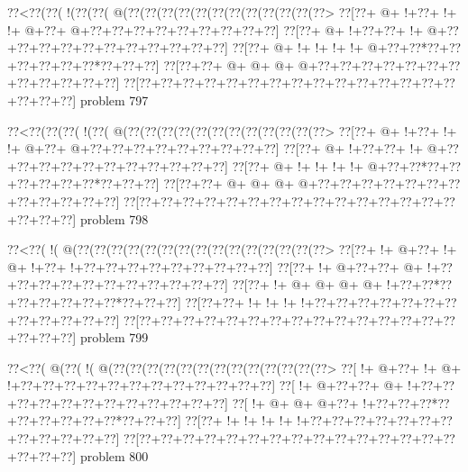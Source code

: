 \vbox{\vbox{\goo
\0??<\0??(\0??(\- !(\0??(\0??(\- @(\0??(\0??(\0??(\0??(\0??(\0??(\0??(\0??(\0??(\0??(\0??(\0??>
\0??[\0??+\- @+\- !+\0??+\- !+\- !+\- @+\0??+\- @+\0??+\0??+\0??+\0??+\0??+\0??+\0??+\0??+\0??]
\0??[\0??+\- @+\- !+\0??+\0??+\- !+\- @+\0??+\0??+\0??+\0??+\0??+\0??+\0??+\0??+\0??+\0??+\0??]
\0??[\0??+\- @+\- !+\- !+\- !+\- !+\- @+\0??+\0??*\0??+\0??+\0??+\0??+\0??+\0??*\0??+\0??+\0??]
\0??[\0??+\0??+\- @+\- @+\- @+\- @+\0??+\0??+\0??+\0??+\0??+\0??+\0??+\0??+\0??+\0??+\0??+\0??]
\0??[\0??+\0??+\0??+\0??+\0??+\0??+\0??+\0??+\0??+\0??+\0??+\0??+\0??+\0??+\0??+\0??+\0??+\0??]
}
\hfil problem 797\hfil\break
}



\vbox{\vbox{\goo
\0??<\0??(\0??(\0??(\- !(\0??(\- @(\0??(\0??(\0??(\0??(\0??(\0??(\0??(\0??(\0??(\0??(\0??(\0??>
\0??[\0??+\- @+\- !+\0??+\- !+\- !+\- @+\0??+\- @+\0??+\0??+\0??+\0??+\0??+\0??+\0??+\0??+\0??]
\0??[\0??+\- @+\- !+\0??+\0??+\- !+\- @+\0??+\0??+\0??+\0??+\0??+\0??+\0??+\0??+\0??+\0??+\0??]
\0??[\0??+\- @+\- !+\- !+\- !+\- !+\- @+\0??+\0??*\0??+\0??+\0??+\0??+\0??+\0??*\0??+\0??+\0??]
\0??[\0??+\0??+\- @+\- @+\- @+\- @+\0??+\0??+\0??+\0??+\0??+\0??+\0??+\0??+\0??+\0??+\0??+\0??]
\0??[\0??+\0??+\0??+\0??+\0??+\0??+\0??+\0??+\0??+\0??+\0??+\0??+\0??+\0??+\0??+\0??+\0??+\0??]
}
\hfil problem 798\hfil\break
}



\vbox{\vbox{\goo
\0??<\0??(\- !(\- @(\0??(\0??(\0??(\0??(\0??(\0??(\0??(\0??(\0??(\0??(\0??(\0??(\0??(\0??(\0??>
\0??[\0??+\- !+\- @+\0??+\- !+\- @+\- !+\0??+\- !+\0??+\0??+\0??+\0??+\0??+\0??+\0??+\0??+\0??]
\0??[\0??+\- !+\- @+\0??+\0??+\- @+\- !+\0??+\0??+\0??+\0??+\0??+\0??+\0??+\0??+\0??+\0??+\0??]
\0??[\0??+\- !+\- @+\- @+\- @+\- @+\- !+\0??+\0??*\0??+\0??+\0??+\0??+\0??+\0??*\0??+\0??+\0??]
\0??[\0??+\0??+\- !+\- !+\- !+\- !+\0??+\0??+\0??+\0??+\0??+\0??+\0??+\0??+\0??+\0??+\0??+\0??]
\0??[\0??+\0??+\0??+\0??+\0??+\0??+\0??+\0??+\0??+\0??+\0??+\0??+\0??+\0??+\0??+\0??+\0??+\0??]
}
\hfil problem 799\hfil\break
}



\vbox{\vbox{\goo
\0??<\0??(\- @(\0??(\- !(\- @(\0??(\0??(\0??(\0??(\0??(\0??(\0??(\0??(\0??(\0??(\0??(\0??(\0??>
\0??[\- !+\- @+\0??+\- !+\- @+\- !+\0??+\0??+\0??+\0??+\0??+\0??+\0??+\0??+\0??+\0??+\0??+\0??]
\0??[\- !+\- @+\0??+\0??+\- @+\- !+\0??+\0??+\0??+\0??+\0??+\0??+\0??+\0??+\0??+\0??+\0??+\0??]
\0??[\- !+\- @+\- @+\- @+\0??+\- !+\0??+\0??+\0??*\0??+\0??+\0??+\0??+\0??+\0??*\0??+\0??+\0??]
\0??[\0??+\- !+\- !+\- !+\- !+\- !+\0??+\0??+\0??+\0??+\0??+\0??+\0??+\0??+\0??+\0??+\0??+\0??]
\0??[\0??+\0??+\0??+\0??+\0??+\0??+\0??+\0??+\0??+\0??+\0??+\0??+\0??+\0??+\0??+\0??+\0??+\0??]
}
\hfil problem 800\hfil\break
}



